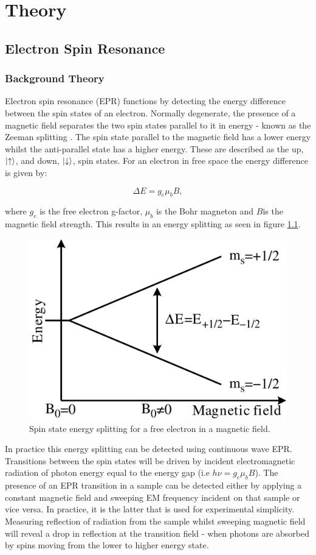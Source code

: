 
\chapter{Theory}

\section{Electron Spin Resonance}
\subsection{Background Theory}

Electron spin resonance (EPR) functions by detecting the energy difference between the spin states of an electron.
Normally degenerate, the presence of a magnetic field separates the two spin states parallel to it in energy - known as the Zeeman splitting \cite{Feher1959}.
The spin state parallel to the magnetic field has a lower energy whilst the anti-parallel state has a higher energy.
These are described as the up, $\ket{\uparrow}$, and down, $\ket{\downarrow}$, spin states.
For an electron in free space the energy difference is given by:

\begin{equation}
\Delta E = g_e\mu_bB,
\label{eq:enSplit}
\end{equation}

where $g_e$ is the free electron g-factor, $\mu_b$ is the Bohr magneton and $B$is the magnetic field strength. 
This results in an energy splitting as seen in figure \ref{fig:elecSplit}. 

\begin{figure}
\centering
\includegraphics[width = 0.5\columnwidth]{Figures/EPR_splitting.png}
\caption[Free electron level splitting]{Spin state energy splitting for a free electron in a magnetic field.}
\label{fig:elecSplit}
\end{figure}

In practice this energy splitting can be detected using continuous wave EPR. Transitions between the spin states will be driven by incident electromagnetic radiation of photon energy equal to the energy gap (i.e $h\nu = g_e\mu_bB$). 
The presence of an EPR transition in a sample can be detected either by applying a constant magnetic field and sweeping EM frequency incident on that sample or vice versa.
In practice, it is the latter that is used for experimental simplicity.
Measuring reflection of radiation from the sample whilst sweeping magnetic field will reveal a drop in reflection at the transition field - when photons are absorbed by spins moving from the lower to higher energy state.

